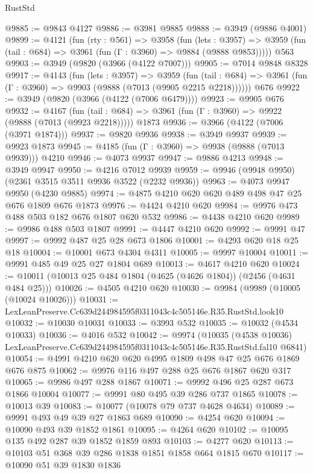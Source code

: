 \begin{lexlean}{RustStd}
\begin{coremodule}
@9885 := @9843 @4127
@9886 := @3981 @9885
@9888 := @3949 (@9886 @4001)
@9899 := @4121
    (fun (rty : @561) =>
    @3958
      (fun (lets : @3957) =>
      @3959 (fun (tail : @684) => @3961 (fun (Γ : @3960) => @9884 (@9888 @9853)))))
    @563
@9903 := @3949 (@9820 (@3966 (@4122 @7007)))
@9905 := @7014 @9848 @8328
@9917 := @4143
    (fun (lets : @3957) =>
    @3959
      (fun (tail : @684) => @3961 (fun (Γ : @3960) => @9903 (@9888 (@7013 (@9905 @2215 @2218))))))
    @676
@9922 := @3949 (@9820 (@3966 (@4122 (@7006 @6479))))
@9923 := @9905 @676
@9932 := @4167
    (fun (tail : @684) => @3961 (fun (Γ : @3960) => @9922 (@9888 (@7013 (@9923 @2218)))))
    @1873
@9936 := @3966 (@4122 (@7006 (@3971 @1874)))
@9937 := @9820 @9936
@9938 := @3949 @9937
@9939 := @9923 @1873
@9945 := @4185 (fun (Γ : @3960) => @9938 (@9888 (@7013 @9939))) @4210
@9946 := @4073 @9937
@9947 := @9886 @4213
@9948 := @3949 @9947
@9950 := @4216 @7012 @9939
@9959 := @9946 (@9948 @9950) (@2361 @3515 @3511 @9936 @3522 (@2232 @9936))
@9963 := @4073 @9947 @9950 (@4230 @9885)
@9974 := @4875 @4210 @620 @620 @489 @498 @47 @25 @676 @1809 @676 @1873
@9976 := @4424 @4210 @620
@9984 := @9976 @473 @488 @503 @182 @676 @1807 @620 @532
@9986 := @4438 @4210 @620
@9989 := @9986 @488 @503 @1807
@9991 := @4447 @4210 @620
@9992 := @9991 @47
@9997 := @9992 @487 @25 @28 @673 @1806
@10001 := @4293 @620 @18 @25 @18
@10004 := @10001 @673 @4304 @4311
@10005 := @9997 @10004
@10011 := @9991 @485 @49 @25 @27 @1804 @689
@10013 := @4617 @4210 @620
@10024 := @10011 (@10013 @25 @484 @1804 (@4625 (@4626 @1804)) (@2456 (@4631 @484 @25)))
@10026 := @4505 @4210 @620
@10030 := @9984 (@9989 (@10005 (@10024 @10026)))
@10031 := LexLeanPreserve.Cc639d244984595f0311043c4c505146e.R35.RustStd.look10
@10032 := @10030 @10031
@10033 := @3993 @532
@10035 := @10032 (@4534 @10033)
@10036 := @4016 @532
@10042 := @9974
    (@10035
      (@4538 @10036)
      LexLeanPreserve.Cc639d244984595f0311043c4c505146e.R35.RustStd.fal10
      @6841)
@10054 := @4991 @4210 @620 @620 @4995 @1809 @498 @47 @25 @676 @1869 @676 @875
@10062 := @9976 @116 @497 @288 @25 @676 @1867 @620 @317
@10065 := @9986 @497 @288 @1867
@10071 := @9992 @496 @25 @287 @673 @1866 @10004
@10077 := @9991 @80 @495 @39 @286 @737 @1865
@10078 := @10013 @39
@10083 := @10077 (@10078 @79 @737 @4628 @4634)
@10089 := @9991 @493 @49 @39 @27 @1863 @689
@10090 := @4254 @620
@10094 := @10090 @493 @39 @1852 @1861
@10095 := @4264 @620
@10102 := @10095 @135 @492 @287 @39 @1852 @1859 @893
@10103 := @4277 @620
@10113 := @10103 @51 @368 @39 @286 @1838 @1851 @1858 @664 @1815 @670
@10117 := @10090 @51 @39 @1830 @1836

\end{coremodule}
\end{lexlean}
